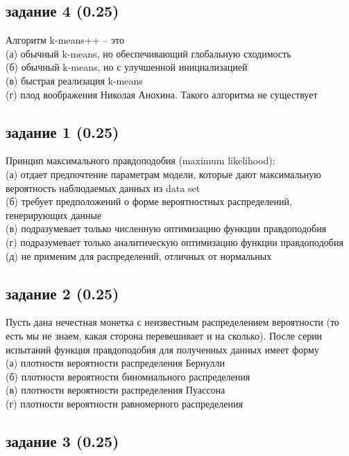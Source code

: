 \documentclass[10pt,a4paper]{article}
\begin{document}
\subsection*{задание 4 (0.25)}

Алгоритм k-means++ -- это \\
(а) обычный k-means, но обеспечивающий глобальную сходимость \\
(б) обычный k-means, но с улучшенной инициализацией \\
(в) быстрая реализация k-means \\
(г) плод воображения Николая Анохина. Такого алгоритма не существует \\

\subsection*{задание 1 (0.25)}

Принцип максимального правдоподобия (maximum likelihood): \\
(а) отдает предпочтение параметрам модели, которые дают максимальную вероятность наблюдаемых данных из data set \\
(б) требует предположений о форме вероятностных распределений, генерирующих данные \\
(в) подразумевает только численную оптимизацию функции правдоподобия \\
(г) подразумевает только аналитическую оптимизацию функции правдоподобия \\
(д) не применим для распределений, отличных от нормальных

\subsection*{задание 2 (0.25)}

Пусть дана нечестная монетка с неизвестным распределением вероятности (то есть мы не знаем, какая сторона перевешивает и на сколько). После серии испытаний функция правдоподобия для полученных данных имеет форму \\
(а) плотности вероятности распределения Бернулли \\
(б) плотности вероятности биномиального распределения \\
(в) плотности вероятности распределения Пуассона \\
(г) плотности вероятности равномерного распределения

\subsection*{задание 3 (0.25)}
\end{document}
